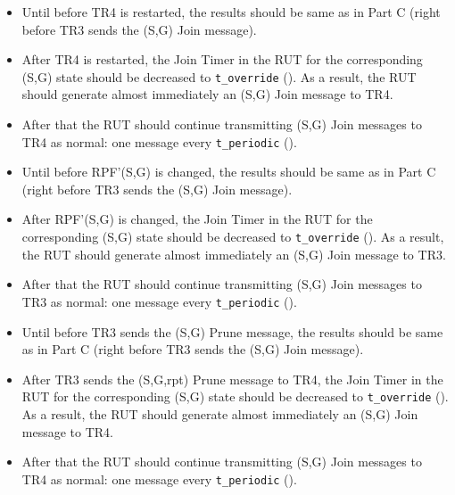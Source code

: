 \documentclass[11pt]{report}
\begin{document}

\begin{itemize}

  \item Until before TR4 is restarted, the results should
  be same as in Part C (right before TR3 sends the (S,G) Join message).

  \item After TR4 is restarted,
  the Join Timer in the RUT for the corresponding (S,G) state
  should be decreased to \verb=t_override= ({\PimsmTOverride}). As a result,
  the RUT should generate almost immediately an (S,G) Join message to TR4.

  \item After that the RUT should continue transmitting 
  (S,G) Join messages to TR4 as normal: one message every \verb=t_periodic=
  ({\PimsmTPeriodic}).

\end{itemize}


\begin{itemize}

  \item Until before RPF'(S,G) is changed, the results should
  be same as in Part C (right before TR3 sends the (S,G) Join message).

  \item After RPF'(S,G) is changed,
  the Join Timer in the RUT for the corresponding (S,G) state
  should be decreased to \verb=t_override= ({\PimsmTOverride}). As a result,
  the RUT should generate almost immediately an (S,G) Join message to TR3.

  \item After that the RUT should continue transmitting 
  (S,G) Join messages to TR3 as normal: one message every \verb=t_periodic=
  ({\PimsmTPeriodic}).

\end{itemize}


\begin{itemize}

  \item Until before TR3 sends the (S,G) Prune message, the results should
  be same as in Part C (right before TR3 sends the (S,G) Join message).

  \item After TR3 sends the (S,G,rpt) Prune message to TR4,
  the Join Timer in the RUT for the corresponding (S,G) state
  should be decreased to \verb=t_override= ({\PimsmTOverride}). As a result,
  the RUT should generate almost immediately an (S,G) Join message to TR4.

  \item After that the RUT should continue transmitting 
  (S,G) Join messages to TR4 as normal: one message every \verb=t_periodic=
  ({\PimsmTPeriodic}).

\end{itemize}
\end{document}
